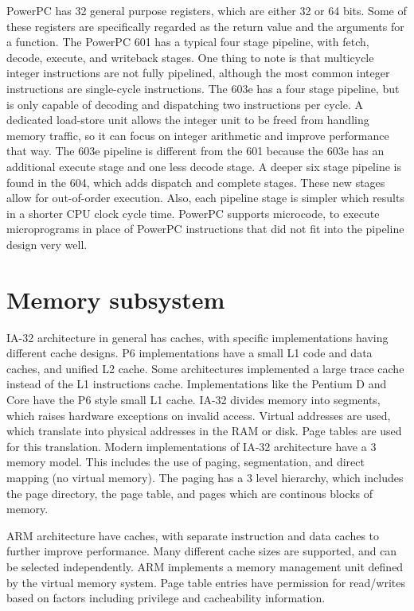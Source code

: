 \documentclass[letterpaper,10pt,titlepage,twocolumn]{article}
\begin{document}
PowerPC has 32 general purpose registers, which are either 32 or 64 bits.
Some of these registers are specifically regarded as the return value and the arguments for a function.
The PowerPC 601 has a typical four stage pipeline, with fetch, decode, execute, and writeback stages.
One thing to note is that multicycle integer instructions are not fully pipelined, although the most common integer instructions are single-cycle instructions.
The 603e has a four stage pipeline, but is only capable of decoding and dispatching two instructions per cycle.
A dedicated load-store unit allows the integer unit to be freed from handling memory traffic, so it can focus on integer arithmetic and improve performance that way.
The 603e pipeline is different from the 601 because the 603e has an additional execute stage and one less decode stage.
A deeper six stage pipeline is found in the 604, which adds dispatch and complete stages.
These new stages allow for out-of-order execution.
Also, each pipeline stage is simpler which results in a shorter CPU clock cycle time.
PowerPC supports microcode, to execute microprograms in place of PowerPC instructions that did not fit into the pipeline design very well.
\newline
\par

\section*{Memory subsystem}

IA-32 architecture in general has caches, with specific implementations having different cache designs.
P6 implementations have a small L1 code and data caches, and unified L2 cache.
Some architectures implemented a large trace cache instead of the L1 instructions cache.
Implementations like the Pentium D and Core have the P6 style small L1 cache.
IA-32 divides memory into segments, which raises hardware exceptions on invalid access.
Virtual addresses are used, which translate into physical addresses in the RAM or disk.
Page tables are used for this translation.
Modern implementations of IA-32 architecture have a 3 memory model.
This includes the use of paging, segmentation, and direct mapping (no virtual memory).
The paging has a 3 level hierarchy, which includes the page directory, the page table, and pages which are continous blocks of memory.
\newline
\par

ARM architecture have caches, with separate instruction and data caches to further improve performance.
Many different cache sizes are supported, and can be selected independently.
ARM implements a memory management unit defined by the virtual memory system.
Page table entries have permission for read/writes based on factors including privilege and cacheability information.
\newline
\par
\end{document}
